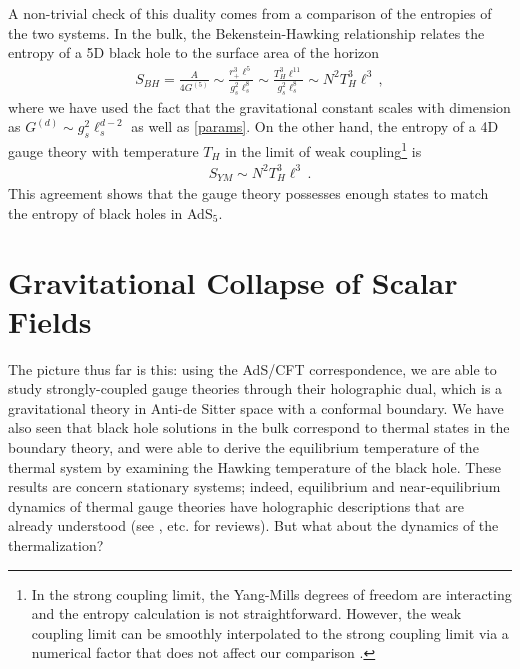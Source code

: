\documentclass[../PhD.tex]{subfiles}
\begin{document}
A non-trivial check of this duality comes from a comparison of the entropies of the two systems. In the bulk, the Bekenstein-Hawking relationship relates the entropy of a 5D black hole to the surface area of the horizon \cite{Bekenstein:1973ur}
\begin{align}
\label{bh dual entropy}
S_{BH} = \frac{A}{4G^{(5)}} \sim \frac{r_+^3 \ell^5}{g_s^2 \ell_s^8} \sim \frac{T_H^3 \ell^{11}}{g_s^2 \ell_s^8} \sim N^2 T_H^3 \ell^3 \, ,
\end{align}
where we have used the fact that the gravitational constant scales with dimension as $G^{(d)} \sim g_s^2 \ell_s^{d-2}$ as well as \eqref{params}. On the other hand, the entropy of a 4D gauge theory with temperature $T_H$ in the limit of weak coupling\footnote{In the strong coupling limit, the Yang-Mills degrees of freedom are interacting and the entropy calculation is not straightforward. However, the weak coupling limit can be smoothly interpolated to the strong coupling limit via a numerical factor that does not affect our comparison \cite{gr-qc/0602037}.} is
\begin{align}
\label{gauge dual entropy}
S_{YM} \sim N^2 T_H^3 \ell^3 \, .
\end{align}
This agreement shows that the gauge theory possesses enough states to match the entropy of black holes in AdS$_5$.


\section{Gravitational Collapse of Scalar Fields}
\label{sec: grav collapse}

The picture thus far is this: using the AdS/CFT correspondence, we are able to study strongly-coupled gauge theories through their holographic dual, which is a gravitational theory in Anti-de Sitter space with a conformal boundary. We have also seen that black hole solutions in the bulk correspond to thermal states in the boundary theory, and were able to derive the equilibrium temperature of the thermal system by examining the Hawking temperature of the black hole. These results are concern stationary systems; indeed, equilibrium and near-equilibrium dynamics of thermal gauge theories have holographic descriptions that are already understood (see \cite{1101.0618}, etc. for reviews). But what about the dynamics of the thermalization? 
\end{document}
